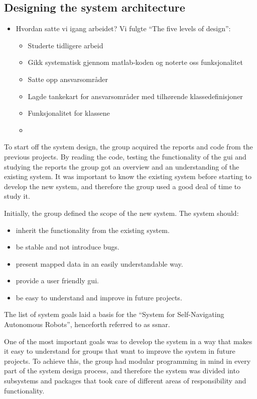 \subsection{Designing the system architecture}
\begin{itemize}
	\item Hvordan satte vi igang arbeidet? Vi fulgte ``The five levels of design'':
	\begin{itemize}
		\item Studerte tidligere arbeid
		\item Gikk systematisk gjennom matlab-koden og noterte oss funksjonalitet
		\item Satte opp ansvarsområder
		\item Lagde tankekart for ansvarsområder med tilhørende klassedefinisjoner
		\item Funksjonalitet for klassene
		\item 
	\end{itemize} 
\end{itemize}

To start off the system design, the group acquired the reports and code from the previous projects. By reading the code, testing the functionality of the \acrshort{gui} and studying the reports the group got an overview and an understanding of the existing system. It was important to know the existing system before starting to develop the new system, and therefore the group used a good deal of time to study it.

Initially, the group defined the scope of the new system. The system should:
\begin{itemize}
	\item inherit the functionality from the existing system.
	\item be stable and not introduce bugs.
	\item present mapped data in an easily understandable way.
	\item provide a user friendly \acrshort{gui}.
	\item be easy to understand and improve in future projects.
\end{itemize}
The list of system goals laid a basis for the ``System for Self-Navigating Autonomous Robots'', henceforth referred to as \acrshort{ssnar}.

One of the most important goals was to develop the system in a way that makes it easy to understand for groups that want to improve the system in future projects. To achieve this, the group had modular programming in mind in every part of the system design process, and therefore the system was divided into subsystems and packages that took care of different areas of responsibility and functionality.